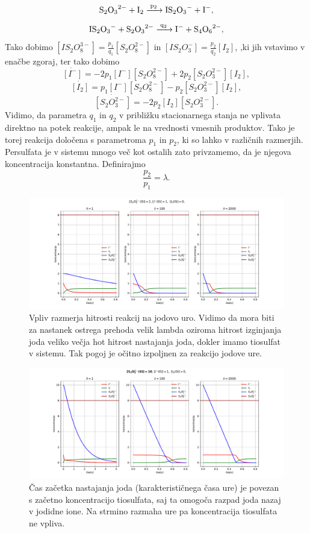 \documentclass[11pt, a4paper]{article}
\begin{document}
\[
\ce{S_2O_3^{2-} + I_2 ->[\ce{p_2}] IS_2O_3^{-} + I^-},
\]
\[
\ce{IS_2O_3^{-} + S_2O_3^{2-} ->[\ce{q_2}] I^- + S_4O_6^{2-}},
\]
Tako dobimo
 $[IS_2O_8^{3-}]=\frac{p_1}{q_1}[S_2O_8^{2-}]$ in $[IS_2O_3^{-}]=\frac{p_2}{q_2}[I_2]$, ,ki jih vstavimo v enačbe zgoraj, ter tako dobimo
\begin{equation}
\dot{[I^-]} = -2p_1[I^-][S_2O_8^{2-}] + 2p_2[S_2O_3^{2-}][I_2],
\end{equation}  
\begin{equation}
\dot{[I_2]} = p_1[I^-][S_2O_8^{2-}] -p_2[S_2O_3^{2-}][I_2],
\end{equation}  
\begin{equation}
\dot{[S_2O_3^{2-}]} = -2p_2[I_2][S_2O_3^{2-}].
\end{equation}
Vidimo, da parametra $q_1$ in $q_2$ v približku stacionarnega stanja ne vplivata direktno na potek reakcije, ampak le na vrednosti vmesnih produktov. Tako je torej reakcija določena s parametroma $p_1$ in $p_2$, ki so lahko v različnih razmerjih. Persulfata je v sistemu mnogo več kot ostalih zato privzamemo, da je njegova koncentracija konstantna. \newline\newline
Definirajmo
\[
\frac{p_2}{p_1} = \lambda.
\]
\begin{figure}[H]
\hspace*{-2cm}     
  \includegraphics[width=20cm]{jodova_ura_1.pdf}
  \caption{Vpliv razmerja hitrosti reakcij na jodovo uro. Vidimo da mora biti za nastanek ostrega prehoda velik lambda oziroma hitrost izginjanja joda veliko večja hot hitrost nastajanja joda, dokler imamo tiosulfat v sistemu. Tak pogoj je očitno izpoljnen za reakcijo jodove ure. } 
\end{figure}
\begin{figure}[H]
\hspace*{-2cm}     
  \includegraphics[width=20cm]{jodova_ura_2_daljsanje_casa.pdf}
  \caption{Čas začetka nastajanja joda (karakterističnega časa ure) je povezan s začetno koncentracijo tiosulfata, saj ta omogoča razpad joda nazaj v jodidne ione. Na strmino razmaha ure pa koncentracija tiosulfata ne vpliva.} 
\end{figure}
\end{document}
